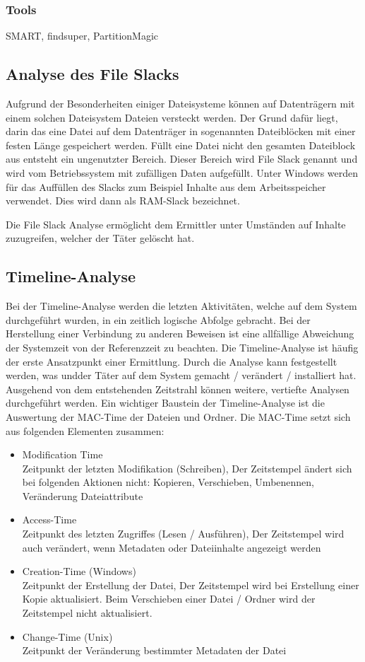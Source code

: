 \subsubsection{Tools}
SMART, findsuper, PartitionMagic


\subsection{Analyse des File Slacks}
Aufgrund der Besonderheiten einiger Dateisysteme können auf Datenträgern mit einem solchen Dateisystem Dateien versteckt werden. Der Grund dafür liegt, darin das eine Datei auf dem Datenträger in sogenannten Dateiblöcken mit einer festen Länge gespeichert werden. Füllt eine Datei nicht den gesamten Dateiblock aus entsteht ein ungenutzter Bereich. Dieser Bereich wird File Slack genannt und wird vom Betriebssystem mit zufälligen Daten aufgefüllt. Unter Windows werden für das Auffüllen des Slacks zum Beispiel Inhalte aus dem Arbeitsspeicher verwendet. Dies wird dann als RAM-Slack bezeichnet.


Die File Slack Analyse ermöglicht dem Ermittler unter Umständen auf Inhalte zuzugreifen, welcher der Täter gelöscht hat.

\subsection{Timeline-Analyse}
Bei der Timeline-Analyse werden die letzten Aktivitäten, welche auf dem System durchgeführt wurden, in ein zeitlich logische Abfolge gebracht. Bei der Herstellung einer Verbindung zu anderen Beweisen ist eine allfällige Abweichung der Systemzeit von der Referenzzeit zu beachten. Die Timeline-Analyse ist häufig der erste Ansatzpunkt einer Ermittlung. Durch die Analyse kann festgestellt werden, was undder Täter auf dem System gemacht / verändert / installiert hat. Ausgehend von dem entstehenden Zeitstrahl können weitere, vertiefte Analysen durchgeführt werden. Ein wichtiger Baustein der Timeline-Analyse ist die Auswertung der MAC-Time der Dateien und Ordner. Die MAC-Time setzt sich aus folgenden Elementen zusammen:

\begin{itemize}
\item Modification Time\\
Zeitpunkt der letzten Modifikation (Schreiben), Der Zeitstempel ändert sich bei folgenden Aktionen nicht: Kopieren, Verschieben, Umbenennen, Veränderung Dateiattribute
\item Access-Time\\
Zeitpunkt des letzten Zugriffes (Lesen / Ausführen), Der Zeitstempel wird auch verändert, wenn Metadaten oder Dateiinhalte angezeigt werden
\item Creation-Time (Windows)\\
Zeitpunkt der Erstellung der Datei, Der Zeitstempel wird bei Erstellung einer Kopie aktualisiert. Beim Verschieben einer Datei / Ordner wird der Zeitstempel nicht aktualisiert.
\item Change-Time (Unix)\\
Zeitpunkt der Veränderung bestimmter Metadaten der Datei
\end{itemize}


